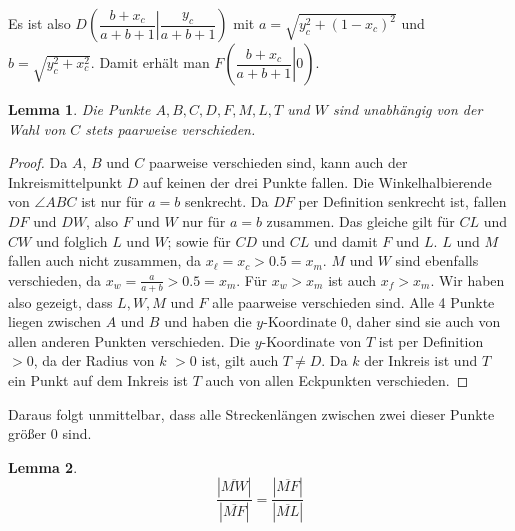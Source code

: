 \documentclass{article}
\newtheorem{lemma}{Lemma}
\newcommand{\strecke}[1]{\left|\overline{#1}\right|}
\begin{document}
    Es ist also $D\left(\dfrac{b+x_c}{a+b+1}\left|\dfrac{y_c}{a+b+1}\right.\right)$ mit $a = \sqrt{y_c^2+(1-x_c)^2}$ und $b = \sqrt{y_c^2+x_c^2}$. Damit erhält man $F\left(\left.\dfrac{b+x_c}{a+b+1}\right|0\right)$.
    \begin{lemma}
    	Die Punkte $A,B,C,D,F,M,L,T$ und $W$ sind unabhängig von der Wahl von $C$ stets paarweise verschieden.
    \end{lemma}
    \begin{proof}
    	Da $A$, $B$ und $C$ paarweise verschieden sind, kann auch der Inkreismittelpunkt $D$ auf keinen der drei Punkte fallen. Die Winkelhalbierende von $\angle ABC$ ist nur für $a=b$ senkrecht. Da $DF$ per Definition senkrecht ist, fallen $DF$ und $DW$, also $F$ und $W$ nur für $a=b$ zusammen. Das gleiche gilt für $CL$ und $CW$ und folglich $L$ und $W$; sowie für $CD$ und $CL$ und damit $F$ und $L$. $L$ und $M$ fallen auch nicht zusammen, da $x_\ell = x_c > 0.5 = x_m$. $M$ und $W$ sind ebenfalls verschieden, da $x_w = \frac{a}{a+b} > 0.5 = x_m$. Für $x_w>x_m$ ist auch $x_f> x_m$. Wir haben also gezeigt, dass $L, W, M$ und $F$ alle paarweise verschieden sind. Alle 4 Punkte liegen zwischen $A$ und $B$ und haben die $y$-Koordinate 0, daher sind sie auch von allen anderen Punkten verschieden.
    	Die $y$-Koordinate von $T$ ist per Definition $>0$, da der Radius von $k$ $>0$ ist, gilt auch $T\neq D$. Da $k$ der Inkreis ist und $T$ ein Punkt auf dem Inkreis ist $T$ auch von allen Eckpunkten verschieden.
    \end{proof}
	\noindent Daraus folgt unmittelbar, dass alle Streckenlängen zwischen zwei dieser Punkte größer 0 sind.
    \begin{lemma}\label{streckenverhaeltnis}
        \[\dfrac{\strecke{MW}}{\strecke{MF}} = \dfrac{\strecke{MF}}{\strecke{ML}}\]
    \end{lemma}
\end{document}
